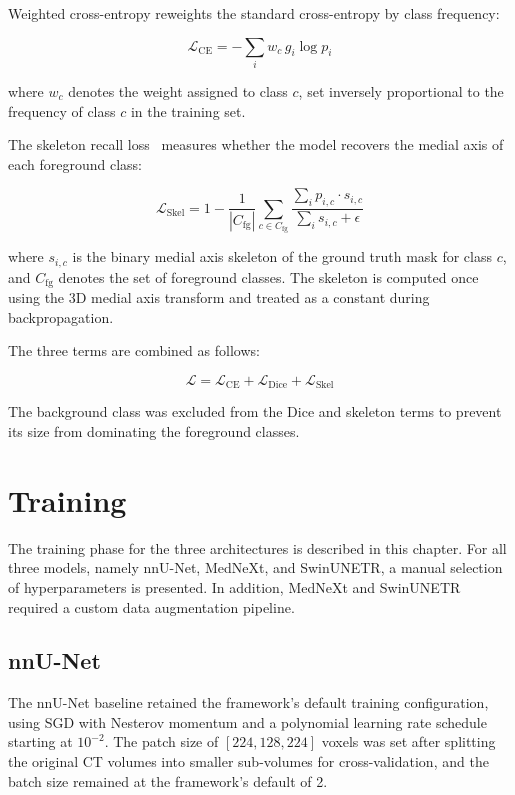 Weighted cross-entropy reweights the standard cross-entropy by class frequency:

\begin{equation}
\mathcal{L}_{\text{CE}} = -\sum_i w_c \, g_i \log p_i
\label{eq:ce}
\end{equation}

where $w_c$ denotes the weight assigned to class $c$, set inversely proportional to the frequency of class $c$ in the training set.

The skeleton recall loss~\cite{kirchhoff2024skeletonrecall} measures whether the model recovers the medial axis of each foreground class:

\begin{equation}
\mathcal{L}_{\text{Skel}} = 1 - \frac{1}{|C_{\text{fg}}|} \sum_{c \in C_{\text{fg}}} \frac{\sum_i p_{i,c} \cdot s_{i,c}}{\sum_i s_{i,c} + \epsilon}
\label{eq:skel}
\end{equation}

where $s_{i,c}$ is the binary medial axis skeleton of the ground truth mask for class $c$, and $C_{\text{fg}}$ denotes the set of foreground classes. The skeleton is computed once using the 3D medial axis transform and treated as a constant during backpropagation.

The three terms are combined as follows:

\begin{equation}
\mathcal{L} = \mathcal{L}_{\text{CE}} + \mathcal{L}_{\text{Dice}} + \mathcal{L}_{\text{Skel}}
\label{eq:combined_loss}
\end{equation}

The background class was excluded from the Dice and skeleton terms to prevent its size from dominating the foreground classes.


\chapter{Training}

The training phase for the three architectures is described in this chapter. For all three models, namely nnU-Net, MedNeXt, and SwinUNETR, a manual selection of hyperparameters is presented. In addition, MedNeXt and SwinUNETR required a custom data augmentation pipeline.

\section{nnU-Net}

The nnU-Net baseline retained the framework's default training configuration, using SGD with Nesterov momentum and a polynomial learning rate schedule starting at $10^{-2}$. The patch size of $[224, 128, 224]$ voxels was set after splitting the original CT volumes into smaller sub-volumes for cross-validation, and the batch size remained at the framework's default of 2.

